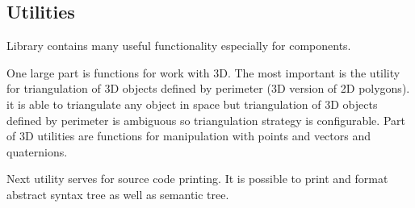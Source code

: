 \subsection{Utilities}

Library contains many useful functionality especially for components.

One large part is functions for work with 3D.
The most important is the utility for triangulation of 3D objects defined by perimeter (3D version of 2D polygons).
it is able to triangulate any object in space but triangulation of 3D objects defined by perimeter is ambiguous so triangulation strategy is configurable.
Part of 3D utilities are functions for manipulation with points and vectors and quaternions.

Next utility serves for source code printing.
It is possible to print and format abstract syntax tree as well as semantic tree.

























